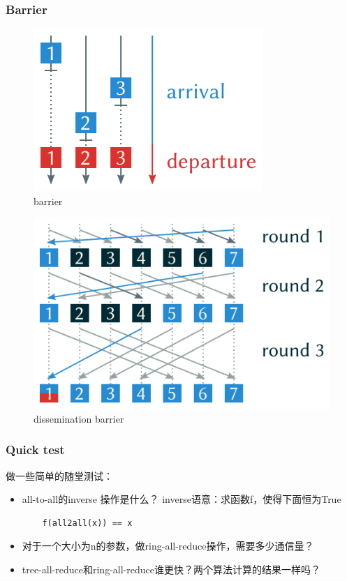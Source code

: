 \documentclass{beamer}
\begin{document}
\begin{frame}[fragile]
\frametitle{Barrier}

\begin{figure}[h]
    \centering
    \includegraphics[height=0.3\textheight]{barrier.png}
    \captionsetup{labelformat=empty}
    \caption{barrier}
\end{figure}

\begin{figure}[h]
    \centering
    \includegraphics[height=0.35\textheight]{dissemination.png}
    \captionsetup{labelformat=empty}
    \caption{dissemination barrier}
\end{figure}

\end{frame}

\begin{frame}[fragile]
\frametitle{Quick test}

做一些简单的随堂测试：

\begin{itemize}
    \item<1-> all-to-all的inverse 操作是什么？\newline
    inverse语意：求函数f，使得下面恒为True
    \begin{verbatim}
    f(all2all(x)) == x
    \end{verbatim}

    \item<2-> 对于一个大小为n的参数，做ring-all-reduce操作，需要多少通信量？\newline

    \item<3-> tree-all-reduce和ring-all-reduce谁更快？两个算法计算的结果一样吗？\newline

\end{itemize}
\end{frame}
\end{document}
